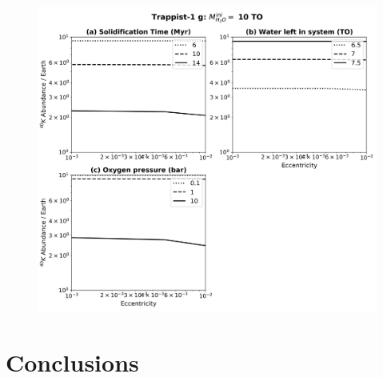 \documentclass[abstract=on, letterpaper]{scrartcl}
\numberwithin{equation}{section}
\begin{document}
\begin{figure}[H]
	\includegraphics[width=\textwidth]{../Fig_Trappist1g_ContourPlot/Trappist-1_g_10TO_CountourPlot}
	\caption{}
	\label{TR1g-Contour}
\end{figure}

\section{Conclusions}

\end{document}
